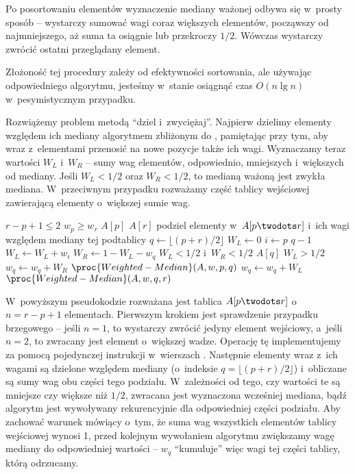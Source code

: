\subproblem %
Po posortowaniu elementów wyznaczenie mediany ważonej odbywa się w~prosty sposób -- wystarczy sumować wagi coraz większych elementów, począwszy od najmniejszego, aż suma ta osiągnie lub przekroczy $1/2$. Wówczas wystarczy zwrócić ostatni przeglądany element.

Złożoność tej procedury zależy od efektywności sortowania, ale używając odpowiedniego algorytmu, jesteśmy w~stanie osiągnąć czas $O(n\lg n)$ w~pesymistycznym przypadku.

\subproblem %
Rozwiążemy problem metodą ``dziel i~zwyciężaj''. Najpierw dzielimy elementy względem ich mediany algorytmem zbliżonym do , pamiętając przy tym, aby wraz z~elementami przenosić na nowe pozycje także ich wagi. Wyznaczamy teraz wartości $W_L$ i~$W_R$ -- sumy wag elementów, odpowiednio, mniejszych i~większych od mediany. Jeśli $W_L<1/2$ oraz $W_R<1/2$, to medianą ważoną jest zwykła mediana. W~przeciwnym przypadku rozważamy część tablicy wejściowej zawierającą elementy o~większej sumie wag.

\begin{codebox}
\li	\If $r-p+1\le2$
\li		\Then
			\If $w_p\ge w_r$ \label{li:weighted-median-boundary-case-begin}
\li				\Then \Return $A[p]$
\li				\Else \Return $A[r]$
				\End \label{li:weighted-median-boundary-case-end}
		\End
\li	podziel elementy w~$A[p\twodots r]$ i~ich wagi względem mediany tej podtablicy \label{li:weighted-median-partition}
\li	$q\gets\lfloor(p+r)/2\rfloor$
\li	$W_L\gets0$
\li	\For $i\gets p$ \To $q-1$
\li		\Do $W_L\gets W_L+w_i$
		\End
\li	$W_R\gets1-W_L-w_q$
\li	\If $W_L<1/2$ i~$W_R<1/2$
\li		\Then \Return $A[q]$
		\End
\li	\If $W_L>1/2$
\li		\Then
			$w_q\gets w_q+W_R$
\li			\Return $\proc{Weighted-Median}(A,w,p,q)$
\li		\Else
			$w_q\gets w_q+W_L$
\li			\Return $\proc{Weighted-Median}(A,w,q,r)$
		\End
\end{codebox}

W~powyższym pseudokodzie rozważana jest tablica $A[p\twodots r]$ o~$n=r-p+1$ elementach. Pierwszym krokiem jest sprawdzenie przypadku brzegowego -- jeśli $n=1$, to wystarczy zwrócić jedyny element wejściowy, a~jeśli $n=2$, to zwracany jest element o~większej wadze. Operację tę implementujemy za pomocą pojedynczej instrukcji  w~wierszach \twodashes{\ref{li:weighted-median-boundary-case-begin}}{\ref{li:weighted-median-boundary-case-end}}. Następnie elementy wraz z~ich wagami są dzielone względem mediany (o~indeksie $q=\lfloor(p+r)/2\rfloor$) i~obliczane są sumy wag obu części tego podziału. W~zależności od tego, czy wartości te są mniejsze czy większe niż $1/2$, zwracana jest wyznaczona wcześniej mediana, bądź algorytm jest wywoływany rekurencyjnie dla odpowiedniej części podziału. Aby zachować warunek mówiący o~tym, że suma wag wszystkich elementów tablicy wejściowej wynosi 1, przed kolejnym wywołaniem algorytmu zwiększamy wagę mediany do odpowiedniej wartości -- $w_q$ ``kumuluje'' więc wagi tej części tablicy, którą odrzucamy.

